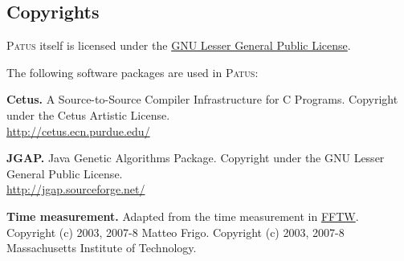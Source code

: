 \subsection{Copyrights}

\textsc{Patus} itself is licensed under the
\href{http://www.gnu.org/licenses/lgpl-3.0.html}{GNU Lesser General Public License}.
\medskip


\noindent The following software packages are used in \textsc{Patus}:
\medskip

\noindent \textbf{Cetus.} A Source-to-Source Compiler Infrastructure for C Programs.
Copyright under the Cetus Artistic License.\\
\url{http://cetus.ecn.purdue.edu/}

\medskip

\noindent \textbf{JGAP.} Java Genetic Algorithms Package.
Copyright under the GNU Lesser General Public License.\\
\url{http://jgap.sourceforge.net/}

\medskip

\noindent \textbf{Time measurement.} Adapted from the time measurement in \href{http://www.fftw.org/}{FFTW}.
Copyright (c) 2003, 2007-8 Matteo Frigo.
Copyright (c) 2003, 2007-8 Massachusetts Institute of Technology.

